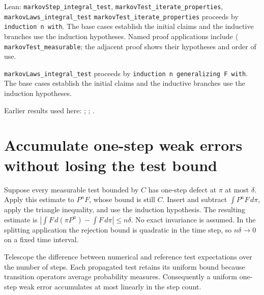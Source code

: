 \documentclass[11pt,a4paper]{article}
\begin{document}
\begin{leanbox}{Lean: \texttt{markovStep\_\allowbreak{}integral\_\allowbreak{}test}, \texttt{markovTest\_\allowbreak{}iterate\_\allowbreak{}properties}, \texttt{markovLaws\_\allowbreak{}integral\_\allowbreak{}test}}
\texttt{markov\allowbreak{}Test\_\allowbreak{}iterate\_\allowbreak{}properties} proceeds by \texttt{induction n with}. The base cases establish the initial claims and the inductive branches use the induction hypotheses. Named proof applications include \texttt{\ensuremath{\langle}markov\allowbreak{}Test\_\allowbreak{}measurable}; the adjacent proof shows their hypotheses and order of use.




\texttt{markov\allowbreak{}Laws\_\allowbreak{}integral\_\allowbreak{}test} proceeds by \texttt{induction n generalizing F with}. The base cases establish the initial claims and the inductive branches use the induction hypotheses.
\end{leanbox}


Earlier results used here: \cite[Section~3.33.11]{LangevinLean2026ULASC}; \cite[Section~3.33.5]{LangevinLean2026ULASC}; \cite[Section~3.33.6]{LangevinLean2026ULASC}.

\section{\texorpdfstring{Accumulate one-step weak errors without losing the test bound}{Accumulate one-step weak errors without losing the test bound}}


Suppose every measurable test bounded by \(C\) has one-step defect at \(\pi\) at most \(\delta\). Apply this estimate to \(P^nF\), whose bound is still \(C\). Insert and subtract \(\int P^nF\,d\pi\), apply the triangle inequality, and use the induction hypothesis. The resulting estimate is \(\left|\int F\,d(\pi P^n)-\int F\,d\pi\right|\le n\delta\). No exact invariance is assumed. In the splitting application the rejection bound is quadratic in the time step, so \(n\delta\to0\) on a fixed time interval.



Telescope the difference between numerical and reference test expectations over the number of steps. Each propagated test retains its uniform bound because transition operators average probability measures. Consequently a uniform one-step weak error accumulates at most linearly in the step count.
\end{document}
